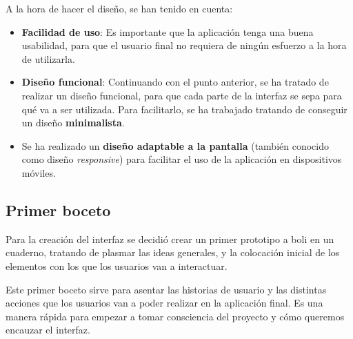 \documentclass{\ClassPath/viu-tfm-template}
\begin{document}
A la hora de hacer el diseño, se han tenido en cuenta:
\vspace{-10pt}
\begin{itemize}
    \item \textbf{Facilidad de uso}: Es importante que la aplicación tenga una buena usabilidad, para que el usuario final no requiera de ningún esfuerzo a la hora de utilizarla.
    \item \textbf{Diseño funcional}: Continuando con el punto anterior, se ha tratado de realizar un diseño funcional, para que cada parte de la interfaz se sepa para qué va a ser utilizada. Para facilitarlo, se ha trabajado tratando de conseguir un diseño \textbf{minimalista}.
    \item Se ha realizado un \textbf{diseño adaptable a la pantalla} (también conocido como diseño \textit{responsive}) para facilitar el uso de la aplicación en dispositivos móviles.
\end{itemize}


\subsection{Primer boceto}
Para la creación del interfaz se decidió crear un primer prototipo a boli en un cuaderno, tratando de plasmar las ideas generales, y la colocación inicial de los elementos con los que los usuarios van a interactuar.

Este primer boceto sirve para asentar las historias de usuario y las distintas acciones que los usuarios van a poder realizar en la aplicación final. Es una manera rápida para empezar a tomar consciencia del proyecto y cómo queremos encauzar el interfaz.
\end{document}
